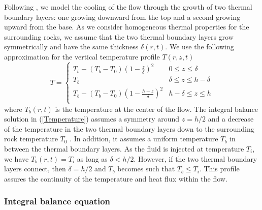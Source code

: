 Following \citet{BALMFORTH:1999ey},  we model the cooling  of the flow
through  the  growth  of  two thermal  boundary  layers:  one  growing
downward from the  top and a second growing upward  from the base.  As
we consider homogeneous thermal  properties for the surrounding rocks,
we assume that the two  thermal boundary layers grow symmetrically and
have  the   same  thickness  $\delta(r,t)$.   We   use  the  following
approximation for the vertical temperature profile $T(r,z,t)$
\begin{equation}
  T=
  \begin{cases}
    T_b - (T_b-T_0)(1-\frac{z}{\delta})^2 & 0 \le z\le \delta \\
    T_b & \delta \le z\le h-\delta \\
    T_b - (T_b-T_0)(1-\frac{h-z}{\delta})^2 & h-\delta \le z\le h\\
  \end{cases}
  \label{Temperature}
\end{equation}
where $T_b(r,t)$  is the temperature at  the center of the  flow.  The
integral balance  solution in  (\ref{Temperature}) assumes  a symmetry
around $z=h/2$  and a decrease of  the temperature in the  two thermal
boundary  layers  down  to  the  surrounding  rock  temperature  $T_0$
\citep{BALMFORTH:1999ey}.    In  addition,   it   assumes  a   uniform
temperature $T_b$  in between the  thermal boundary layers.   As
the fluid is injected at  temperature $T_i$, we have $T_b(r,t) =T_i$
as long as $\delta<h/2$.  However, if the two thermal boundary layers
connect,  then   $\delta  =  h/2$   and  $T_b$  becomes   such  that
$T_b\le T_i$.  This profile assures  the continuity of  the temperature
and heat flux within the flow.


\subsubsection{Integral balance equation}
\label{sec:integr-balance-equat}

